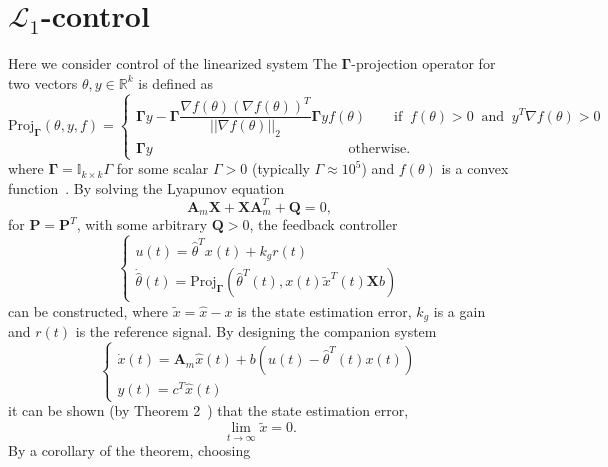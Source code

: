 \documentclass{article}
\begin{document}
\section{$\mathcal{L}_1$-control}
Here we consider control of the linearized system
The $\mathbf{\Gamma}$-projection operator for two vectors $\theta,y\in\mathbb{R}^k$ is defined as
\begin{equation}
\text{Proj}_{\mathbf{\Gamma}}(\theta,y,f) =
\begin{cases}
\mathbf{\Gamma} y - \mathbf{\Gamma}\dfrac{\nabla f(\theta)(\nabla f(\theta))^T}{||\nabla f(\theta)||_2}\mathbf{\Gamma} yf(\theta)\qquad
\text{if}\;\;f(\theta)>0\;\;\text{and}\;\;y^T\nabla f(\theta)>0\\
\mathbf{\Gamma} y\qquad\qquad\qquad\qquad\qquad\qquad\quad\quad\text{otherwise}.
\end{cases}
\end{equation}
where $\mathbf{\Gamma} = \mathbb{I}_{k\times k}\Gamma$ for some scalar $\Gamma > 0$ (typically $\Gamma\approx 10^5$) and $f(\theta)$ is a convex function~\cite{lavretsky2011projection}. By solving the Lyapunov equation
\begin{equation}
\mathbf{A}_m\mathbf{X}+ \mathbf{X}\mathbf{A}_m^T+ \mathbf{Q} = 0,
\end{equation}
for $\mathbf{P}=\mathbf{P}^T$, with some arbitrary $\mathbf{Q}>0$, the feedback controller
\begin{equation}
\begin{cases}
u(t)=\hat{\theta}^Tx(t)+k_gr(t)\\
\dot{\hat{\theta}}(t) = \text{Proj}_{\mathbf{\Gamma}}(\hat{\theta}^T(t),x(t)\tilde{x}^T(t)\mathbf{X}b)
\end{cases}
\end{equation}
can be constructed, where $\tilde{x} = \hat{x} - x$ is the state estimation error, $k_g$ is a gain and $r(t)$ is the reference signal. By designing the companion system
\begin{equation}
\begin{cases}
\dot{x}(t) = \mathbf{A}_m\hat{x}(t) + b(u(t)-\hat{\theta}^T(t)x(t))\\
y(t) = c^T\hat{x}(t)
\end{cases}
\end{equation}
it can be shown (by Theorem 2~\cite{cao2006design}) that the state estimation error,
\begin{equation}
\lim_{t\rightarrow\infty}\tilde{x} = 0.
\end{equation}
By a corollary of the theorem, choosing
\end{document}

